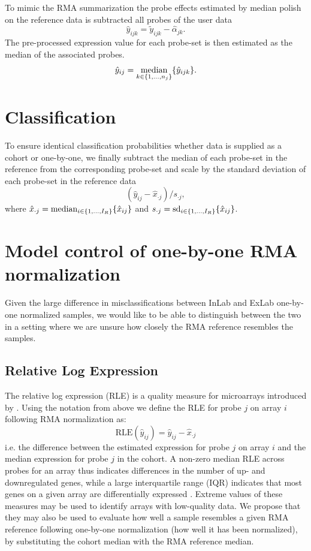 To mimic the RMA summarization the probe effects estimated by median polish on the reference data is subtracted all probes of the user data
\begin{equation*}
   \hat{y}_{ijk} = \tilde{y}_{ijk} - \hat{\alpha}_{jk}.
\end{equation*}
The pre-processed expression value for each probe-set is then estimated as the median of the associated probes.
\begin{equation*}
   \hat{y}_{ij} = \operatorname*{median}_{k \in \{1,\dots,n_j \}} \{ \hat{y}_{ijk} \}.
\end{equation*}


\section{Classification}
To ensure identical classification probabilities whether data is supplied as a cohort or one-by-one, we finally subtract the median of each probe-set in the reference from the corresponding probe-set and scale by the standard deviation of each probe-set in the reference data
\begin{equation*}
  (\hat{y}_{ij} - \hat{x}_{\cdot j})/s_{\cdot j},
\end{equation*}
where
$\hat{x}_{\cdot j} = \operatorname*{median}_{i \in \{1,\dots,I_R \}} \{\hat{x}_{ij}\}$ and
$s_{\cdot j} = \operatorname*{sd}_{i \in \{1,\dots,I_R\}} \{\hat{x}_{ij}\}$.


\section{Model control of one-by-one RMA normalization} \label{sec_rle}
Given the large difference in misclassifications  between InLab and ExLab one-by-one normalized samples, we would like to be able to distinguish between the two in a setting where we are unsure how closely the RMA reference resembles the samples.

\subsection{Relative Log Expression} 
The relative log expression (RLE)	is a quality measure for microarrays introduced by \mbox{\citet{Bolstad2004b}}. Using the notation from above we define the RLE for probe $j$ on array $i$ following RMA normalization as:
\[
	\textrm{RLE}(\hat{y}_{ij}) = \hat{y}_{ij} - \hat{x}_{\cdot j}
\]
i.e. the difference between the estimated expression for probe $j$ on array $i$ and the median expression for probe $j$ in the cohort. A non-zero median RLE across probes for an array thus indicates differences in the number of up- and downregulated genes, while a large interquartile range (IQR) indicates that most genes on a given array are differentially expressed \mbox{\citep{McCall2011}}. Extreme values of these measures may be used to identify arrays with low-quality data. We propose that they may also be used to evaluate how well a sample resembles a given RMA reference following one-by-one normalization (how well it has been normalized), by substituting the cohort median with the RMA reference median.

